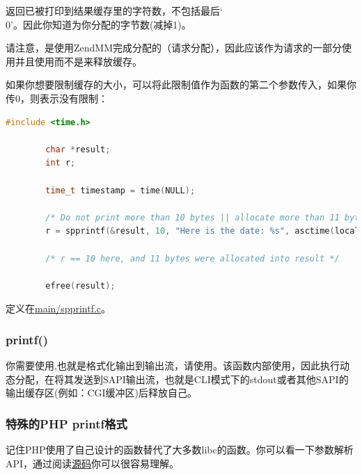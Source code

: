 返回已被打印到结果缓存里的字符数，不包括最后‘\\0’。因此你知道为你分配的字节数(减掉1)。

请注意，是使用ZendMM完成分配的（请求分配），因此应该作为请求的一部分使用并且使用而不是来释放缓存。


如果你想要限制缓存的大小，可以将此限制值作为函数的第二个参数传入，如果你传0，则表示没有限制：

\begin{lstlisting}[language=c]
        #include <time.h>

        char *result;
        int r;

        time_t timestamp = time(NULL);

        /* Do not print more than 10 bytes || allocate more than 11 bytes */
        r = spprintf(&result, 10, "Here is the date: %s", asctime(localtime(&timestamp)));

        /* r == 10 here, and 11 bytes were allocated into result */

        efree(result);
\end{lstlisting}        


定义在\href{https://github.com/php/php-src/blob/648be8600ff89e1b0e4a4ad25cebad42b53bed6d/main/spprintf.c}{main/spprintf.c}。

\subsubsection{printf()}

你需要使用,也就是格式化输出到输出流，请使用。该函数内部使用，因此执行动态分配，在将其发送到SAPI输出流，也就是CLI模式下的stdout或者其他SAPI的输出缓存区(例如：CGI缓冲区)后释放自己。

\subsubsection{特殊的PHP printf格式}

记住PHP使用了自己设计的函数替代了大多数libc的函数。你可以看一下参数解析API，通过阅读\href{https://github.com/php/php-src/blob/509f5097ab0b578adc311c720afcea8de266aadd/main/spprintf.c#L203}{源码}你可以很容易理解。

